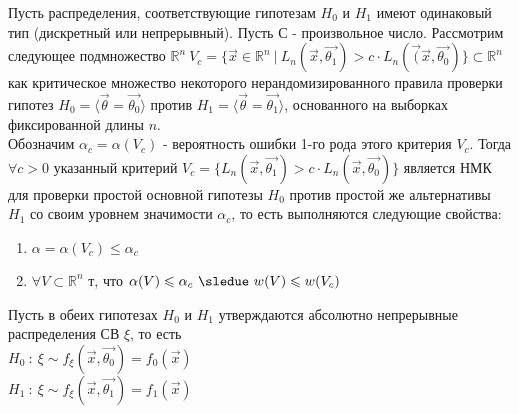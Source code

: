 \begin{lemma}
  Пусть распределения, соответствующие гипотезам $H_0$ и $H_1$ имеют одинаковый тип
  (дискретный или непрерывный). Пусть С - произвольное число. Рассмотрим следующее
  подмножество $\mathbb{R}^n \ V_c=\{\overrightarrow{x}\in \mathbb{R}^n \ | \ L_n(\overrightarrow{x}, \overrightarrow{\theta_1}) >
  c\cdot L_n(\overrightarrow(\overrightarrow{x}, \overrightarrow{\theta_0})\} \subset \mathbb{R}^n$ как критическое
  множество некоторого нерандомизированного правила проверки гипотез $H_0=\langle\overrightarrow{\theta}=\overrightarrow{\theta_0}\rangle$
  против $H_1=\langle\overrightarrow{\theta}=\overrightarrow{\theta_1}\rangle$, основанного на выборках фиксированной длины $n$.\\
  Обозначим $\alpha_c=\alpha(V_c)$ - вероятность ошибки 1-го рода этого критерия $V_c$. Тогда $\forall c > 0$ указанный критерий
  $V_c=\{L_n(\overrightarrow{x},\overrightarrow{\theta_1}) > c\cdot L_n(\overrightarrow{x},\overrightarrow{\theta_0})\}$ является НМК
  для проверки простой основной гипотезы $H_0$ против простой же альтернативы $H_1$ со своим уровнем значимости $\alpha_c$, то есть
  выполняются следующие свойства:
  \begin{enumerate}
      \item $\alpha = \alpha(V_c) \leqslant \alpha_c$
      \item $\forall V \subset \mathbb{R}^n$ т, что $\alpha(V) \leqslant \alpha_c \ \sledue \ w(V) \leqslant w(V_c)$
  \end{enumerate}
  \begin{dokvo}
      Пусть в обеих гипотезах $H_0$ и $H_1$ утверждаются абсолютно непрерывные распределения СВ $\xi$, то есть\\
      $H_0 \ : \ \xi \sim f_{\xi}(\overrightarrow{x}, \overrightarrow{\theta_0}) = f_0(\overrightarrow{x})$\\
      $H_1 \ : \ \xi \sim f_{\xi}(\overrightarrow{x}, \overrightarrow{\theta_1}) = f_1(\overrightarrow{x})$\\


\end{dokvo}
\end{lemma}
